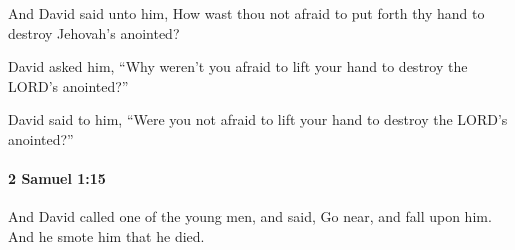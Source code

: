 			\begin{versebox}
					\item[BHS] 
					\item[ASV] And David said unto him, How wast thou not afraid to put forth thy hand to destroy Jehovah's anointed?
					\item[NIV] David asked him, “Why weren’t you afraid to lift your hand to destroy the LORD’s anointed?”
					\item[NRSV] David said to him, “Were you not afraid to lift your hand to destroy the LORD’s anointed?”
			\end{versebox}

		\paragraph{2 Samuel 1:15} %
			\label{2SAMUEL-1-15}

			And David called one of the young men, and said, Go near, and fall upon him. And he smote him that he died.

